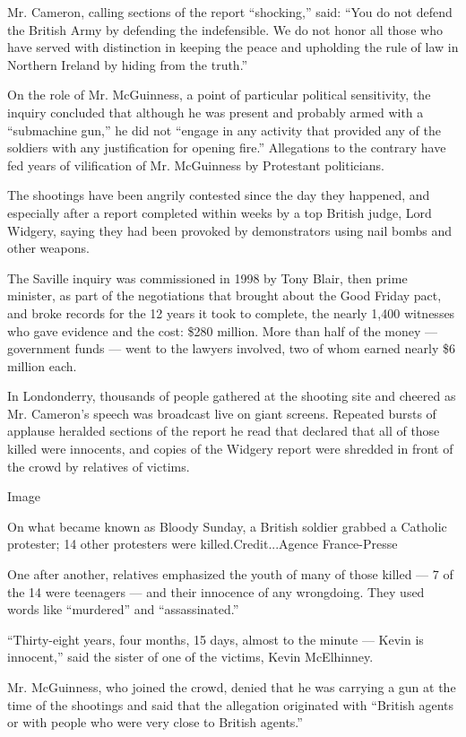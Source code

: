 Mr. Cameron, calling sections of the report ``shocking,'' said: ``You do
not defend the British Army by defending the indefensible. We do not
honor all those who have served with distinction in keeping the peace
and upholding the rule of law in Northern Ireland by hiding from the
truth.''

On the role of Mr. McGuinness, a point of particular political
sensitivity, the inquiry concluded that although he was present and
probably armed with a ``submachine gun,'' he did not ``engage in any
activity that provided any of the soldiers with any justification for
opening fire.'' Allegations to the contrary have fed years of
vilification of Mr. McGuinness by Protestant politicians.

The shootings have been angrily contested since the day they happened,
and especially after a report completed within weeks by a top British
judge, Lord Widgery, saying they had been provoked by demonstrators
using nail bombs and other weapons.

The Saville inquiry was commissioned in 1998 by Tony Blair, then prime
minister, as part of the negotiations that brought about the Good Friday
pact, and broke records for the 12 years it took to complete, the nearly
1,400 witnesses who gave evidence and the cost: \$280 million. More than
half of the money --- government funds --- went to the lawyers involved,
two of whom earned nearly \$6 million each.

In Londonderry, thousands of people gathered at the shooting site and
cheered as Mr. Cameron's speech was broadcast live on giant screens.
Repeated bursts of applause heralded sections of the report he read that
declared that all of those killed were innocents, and copies of the
Widgery report were shredded in front of the crowd by relatives of
victims.

Image

On what became known as Bloody Sunday, a British soldier grabbed a
Catholic protester; 14 other protesters were killed.Credit...Agence
France-Presse

One after another, relatives emphasized the youth of many of those
killed --- 7 of the 14 were teenagers --- and their innocence of any
wrongdoing. They used words like ``murdered'' and ``assassinated.''

``Thirty-eight years, four months, 15 days, almost to the minute ---
Kevin is innocent,'' said the sister of one of the victims, Kevin
McElhinney.

Mr. McGuinness, who joined the crowd, denied that he was carrying a gun
at the time of the shootings and said that the allegation originated
with ``British agents or with people who were very close to British
agents.''

